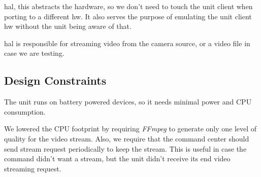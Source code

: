 \acrfull{hal}, this abstracts the hardware, so we don't need to touch the unit client when porting to a different \acrshort{hw}.
It also serves the purpose of emulating the unit client \acrshort{hw} without the unit being aware of that.

\acrshort{hal} is responsible for streaming video from the camera source, or a video file in case we are testing.

\subsection{Design Constraints}
The unit runs on battery powered devices, so it needs minimal power and CPU consumption.

We lowered the CPU footprint by requiring \textit{FFmpeg} to generate only one level of quality for the video stream.
Also, we require that the command center should send stream request periodically to keep the stream. This is useful in case the command didn't want a stream, but the unit didn't receive its end video streaming request.
